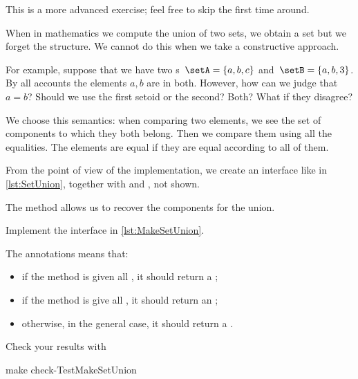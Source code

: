 \begin{remark}
    This is a more advanced exercise; feel free to skip the first time around.
\end{remark}

When in mathematics we compute the union of two sets, we obtain a set but we forget the structure.
We cannot do this when we take a constructive approach.

For example, suppose that we have two \Setoid{}s~$\setA = \{a,b,c\}$ and~$\setB = \{a,b,3\}$.
By all accounts the elements $a,b$ are in both.
However, how can we judge that~$a=b$?
Should we use the first setoid or the second?
Both?
What if they disagree?

We choose this semantics: when comparing two elements, we see the set of components to which they both belong.
Then we compare them using all the equalities.
The elements are equal if they are equal according to all of them.

From the point of view of the implementation, we create an interface like in \cref{lst:SetUnion}, together with \EnumerableSetUnion and \FiniteSetUnion, not shown.


The method  allows us to recover the components for the union.

\begin{codeexercise}
    Implement the interface in \cref{lst:MakeSetUnion}.
\end{codeexercise}

The  annotations means that:
\begin{itemize}
    \item if the method is given all \FiniteSet, it should return a \FiniteSet;
    \item if the method is give all \EnumerableSet, it should return an \EnumerableSet;
    \item otherwise, in the general case, it should return a \Setoid.
\end{itemize}


Check your results with
\begin{console}
    make check-TestMakeSetUnion
\end{console}


